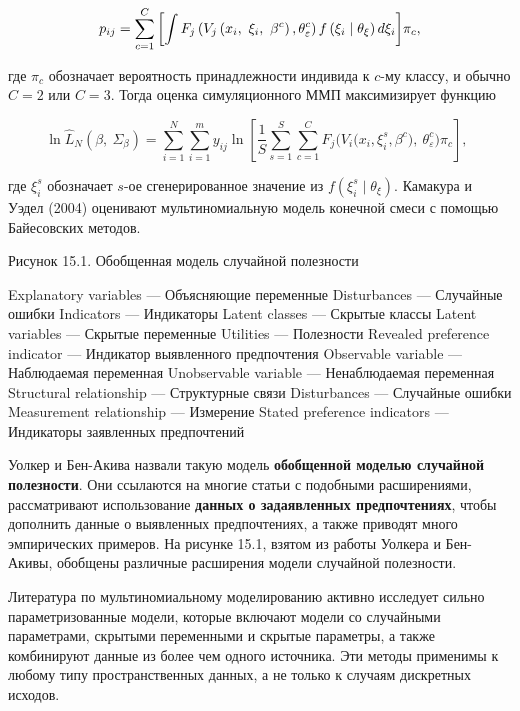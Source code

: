 \begin{equation} \label{GrindEQ__15_44_} p_{ij}=\sum^C_{c=1}{\left[\int{F_j\left(V_j\left(x_i,\ {\xi }_i,\ {\beta }^c\right),{\theta }^c_{\varepsilon }\right)f\left({\xi }_i\mathrel{\left|\vphantom{{\xi }_i {\theta }_{\xi }}\right.\kern-\nulldelimiterspace}{\theta }_{\xi }\right)d{\xi }_i}\right]}{\pi }_c, \end{equation} 

где ${\pi }_c$ обозначает вероятность принадлежности индивида к $c$-му классу, и обычно $C=2$ или $C=3$. Тогда оценка симуляционного ММП максимизирует функцию

\[{\ln  {\hat{L}}_N(\beta ,\ {\Sigma }_{\beta })=\sum^N_{i=1}{\sum^m_{i=1}{y_{ij}{\ln  \left[\frac{1}{S}\sum^S_{s=1}{\sum^C_{c=1}{F_j(V_i(}x_i,{\xi }^s_i,{\beta }^c),\ {\theta }^c_{\varepsilon }){\pi }_c}\right],\ }}}\ }\] 

где ${\xi }^s_i$ обозначает $s$-ое сгенерированное значение из $f\left({\xi }^s_i \mid {\theta }_{\xi }\right)$. Камакура и Уэдел (2004) оценивают мультиномиальную модель конечной смеси с помощью Байесовских методов.



Рисунок 15.1. Обобщенная модель случайной полезности

Explanatory variables --- Объясняющие переменные
Disturbances --- Случайные ошибки
Indicators --- Индикаторы
Latent classes --- Скрытые классы
Latent variables --- Скрытые переменные
Utilities --- Полезности
Revealed preference indicator --- Индикатор выявленного предпочтения
Observable variable --- Наблюдаемая переменная
Unobservable variable --- Ненаблюдаемая переменная
Structural relationship --- Структурные связи
Disturbances --- Случайные ошибки
Measurement relationship --- Измерение
Stated preference indicators --- Индикаторы заявленных предпочтений



Уолкер и Бен-Акива назвали такую модель \textbf{обобщенной моделью случайной полезности}. Они ссылаются на многие статьи с подобными расширениями, рассматривают использование \textbf{данных о задаявленных предпочтениях}, чтобы дополнить данные о выявленных предпочтениях, а также приводят много эмпирических примеров. На рисунке 15.1, взятом из работы Уолкера и Бен-Акивы, обобщены различные расширения модели случайной полезности.

Литература по мультиномиальному моделированию активно исследует сильно параметризованные модели, которые включают модели со случайными параметрами, скрытыми переменными и скрытые параметры, а также комбинируют данные из более чем одного источника. Эти методы применимы к любому типу пространственных данных, а не только к случаям дискретных исходов.


